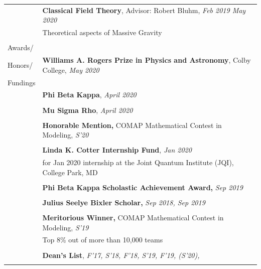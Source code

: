 \documentclass[10pt]{article}
\begin{document}
\begin{longtable}{ l p{14.5cm}   }
	& \textbf{Classical Field Theory}, Advisor: Robert Bluhm, \textit{Feb 2019 \textendash May 2020}\\
	& Theoretical aspects of Massive Gravity\\
	& \\

     					
     					



\large{Awards/}    	& \\
\large{Honors/}		& \textbf{Williams A. Rogers Prize in Physics and Astronomy}, Colby College, \textit{May 2020} \\
\large{Fundings}	& \\
& \textbf{Phi Beta Kappa}, \textit{April 2020} \\
& \\
& \textbf{Mu Sigma Rho}, \textit{April 2020}\\
&\\
& \textbf{Honorable Mention,}  COMAP Mathematical Contest in Modeling, \textit{S'20}\\
&\\
& \textbf{Linda K. Cotter Internship Fund}, \textit{Jan 2020}\\
& for Jan 2020 internship at the Joint Quantum Institute (JQI), College Park, MD\\
&\\
& \textbf{Phi Beta Kappa Scholastic Achievement Award,} \textit{Sep 2019}\\
&\\
& \textbf{Julius Seelye Bixler Scholar,} \textit{Sep 2018, Sep 2019}\\
&\\
& \textbf{Meritorious Winner,}  COMAP Mathematical Contest in Modeling, \textit{S'19}\\
& Top 8\% out of more than 10,000 teams\\
&\\
& \textbf{Dean’s List}, \textit{F'17, S'18, F'18, S'19, F'19, (S'20), }\\
&\\
		

\end{longtable}
\end{document}
